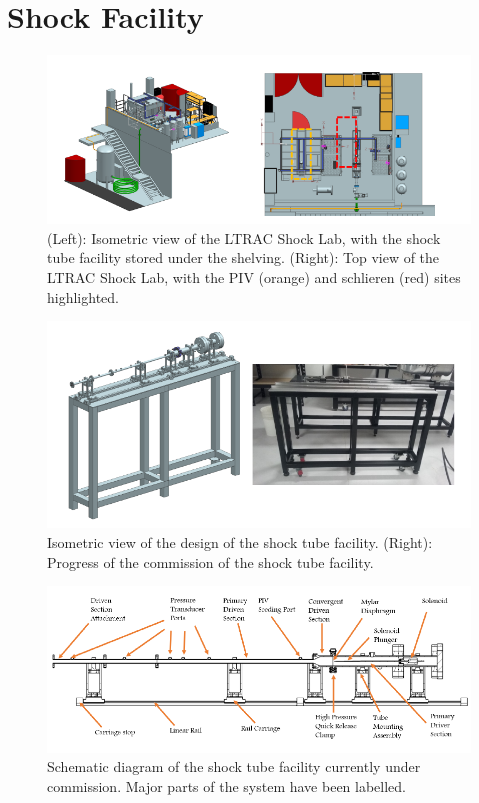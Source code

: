 \normalsize
\newpage

\appendix
{}

\section{Shock Facility} \label{app:facility}

\begin{figure}[H] 
	\centering
	\includegraphics[width=1.05\textwidth]{fig10.PNG} 
	\caption{(Left): Isometric view of the LTRAC Shock Lab, with the shock tube facility stored under the
		shelving. (Right): Top view of the LTRAC Shock Lab, with the PIV (orange) and schlieren (red) sites
		highlighted.}
	\label{fig:10}
\end{figure}

\begin{figure}[H] 
	\centering
	\includegraphics[width=1.05\textwidth]{fig8.PNG} 
	\caption{Isometric view of the design of the shock tube facility. (Right): Progress of the commission
		of the shock tube facility.}
	\label{fig:8}
\end{figure}

\begin{figure}[H] 
	\centering
	\includegraphics[width=1.05\textwidth]{fig9.PNG} 
	\caption{Schematic diagram of the shock tube facility currently under commission. Major parts of the
		system have been labelled.}
	\label{fig:9}
\end{figure}	

